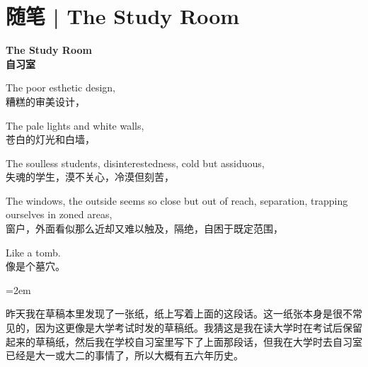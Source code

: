 \chapter{随笔 | The Study Room}






\parindent=0pt

\textbf{The Study Room\\
自习室}

The poor esthetic design,\\
糟糕的审美设计，

The pale lights and white walls,\\
苍白的灯光和白墙，

The soulless students, disinterestedness, cold but assiduous,\\
失魂的学生，漠不关心，冷漠但刻苦，

The windows, the outside seems so close but out of reach, separation, trapping ourselves in zoned areas,\\
窗户，外面看似那么近却又难以触及，隔绝，自困于既定范围，

Like a tomb.\\
像是个墓穴。


\parindent=2em

昨天我在草稿本里发现了一张纸，纸上写着上面的这段话。这一纸张本身是很不常见的，因为这更像是大学考试时发的草稿纸。我猜这是我在读大学时在考试后保留起来的草稿纸，然后我在学校自习室里写下了上面那段话，但我在大学时去自习室已经是大一或大二的事情了，所以大概有五六年历史。

